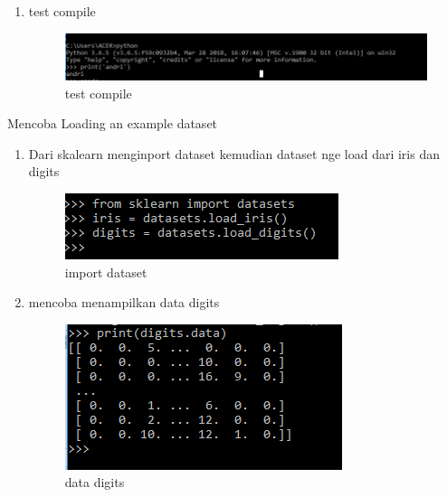 \begin {enumerate}
\item test compile
\par
\begin{figure}[ht]
\centering
\includegraphics[scale=0.5]{figures/4.png}
\caption{test compile}
\label{contoh}
\end{figure}
\end {enumerate}
\par

Mencoba Loading an example dataset
\begin {enumerate}
\par
\item Dari skalearn menginport dataset kemudian dataset nge load dari iris dan digits
\par
\begin{figure}[ht]
\centering
\includegraphics[scale=0.5]{figures/5.png}
\caption{import dataset}
\label{contoh}
\end{figure}
\par
\item mencoba menampilkan data digits
\par
\begin{figure}[ht]
\centering
\includegraphics[scale=0.5]{figures/6.png}
\caption{data digits}
\label{contoh}
\end{figure}
\end {enumerate}

